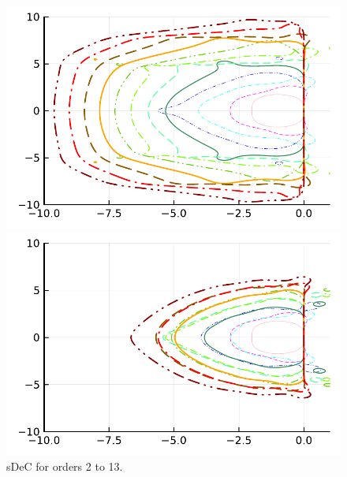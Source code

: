 \begin{figure}
	\centering
	\begin{minipage}[t]{0.45\textwidth}
		\includegraphics[width=\textwidth]{pdf/odepics/sDeC_eq_ord13.pdf}
	\end{minipage}
	\begin{minipage}[t]{0.45\textwidth}
		\includegraphics[width=\textwidth]{pdf/odepics/sDeC_GLB_ord13.pdf}
	\end{minipage}
	\caption{sDeC for orders 2 to 13.}
	\label{fig: ODEEXsDeC}
\end{figure}
